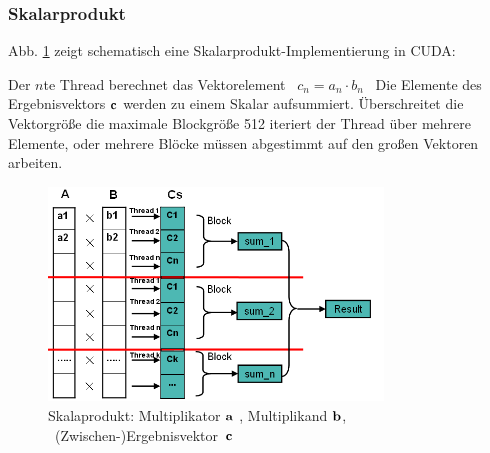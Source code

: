 


\subsubsection{Skalarprodukt}

Abb. \ref{Vektor} zeigt schematisch eine Skalarprodukt-Implementierung in CUDA:

Der $n$te Thread berechnet das Vektorelement \mbox{ $c_n = a_n \cdot b_n$ }
Die Elemente des Ergebnisvektors $ \bf c $ werden  zu einem Skalar
aufsummiert.
Überschreitet die Vektorgröße die maximale Blockgröße 512 iteriert der Thread
über mehrere Elemente, oder mehrere Blöcke müssen
abgestimmt auf den großen Vektoren arbeiten.


\begin{figure}[htbp]
\includegraphics[width=3.5in]{../xby/pic/Vektor}
\caption{ \label{Vektor} Skalaprodukt: Multiplikator $ \bf a$ , Multiplikand $ \bf b$,
\mbox{ (Zwischen-)Ergebnisvektor $\bf c$ }}

\end{figure}